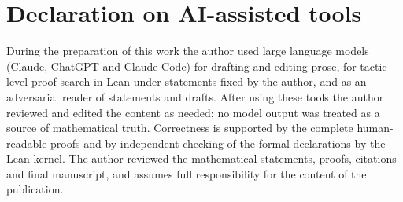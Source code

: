 \documentclass[11pt]{article}
\theoremstyle{plain}
\theoremstyle{definition}
\theoremstyle{remark}
\theoremstyle{plain}
\theoremstyle{definition}
\theoremstyle{remark}
\theoremstyle{plain}
\theoremstyle{definition}
\theoremstyle{remark}
\begin{document}
\section*{Declaration on AI-assisted tools}
During the preparation of this work the author used large language models (Claude, ChatGPT and Claude Code) for drafting and editing prose, for tactic-level proof search in Lean under statements fixed by the author, and as an adversarial reader of statements and drafts. After using these tools the author reviewed and edited the content as needed; no model output was treated as a source of mathematical truth. Correctness is supported by the complete human-readable proofs and by independent checking of the formal declarations by the Lean kernel. The author reviewed the mathematical statements, proofs, citations and final manuscript, and assumes full responsibility for the content of the publication.

\end{document}
